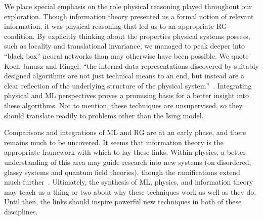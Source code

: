 We place special emphasis on the role physical reasoning played
throughout our exploration. Though information theory presented us a
formal notion of relevant information, it was physical reasoning that
led us to an appropriate RG condition. By explicitly thinking about
the properties physical systems possess, such as locality and
translational invariance, we managed to peak deeper into ``black box''
neural networks than may otherwise have been possible. We quote
Koch-Janusz and Ringel, ``the internal data representations discovered
by suitably designed algorithms are not just technical means to an
end, but instead are a clear reflection of the underlying structure of
the physical system''~\cite{kjr}. Integrating physical and ML
perspectives proves a promising basis for a better insight into these
algorithms.  Not to mention, these techniques are unsupervised, so
they should translate readily to problems other than the Ising model.

Comparisons and integrations of ML and RG are at an early phase, and
there remains much to be uncovered. It seems that information theory
is the appropriate framework with which to lay these links. Within
physics, a better understanding of this area may guide research into
new systems (on disordered, glassy systems and quantum field
theories), though the ramifications extend much
further~\cite{kjr}. Ultimately, the synthesis of ML, physics, and
information theory may teach us a thing or two about why these
techniques work as well as they do. Until then, the links should
inspire powerful new techniques in both of these disciplines.
